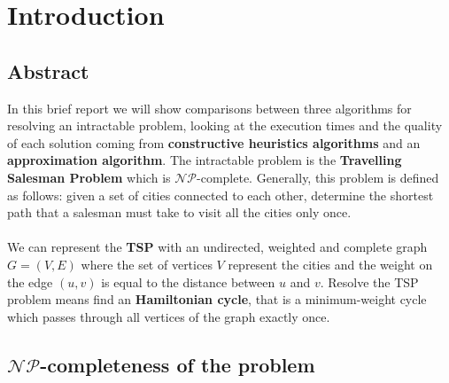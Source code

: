 \section{Introduction}


\subsection{Abstract}
In this brief report we will show comparisons between three algorithms for resolving an intractable problem, looking at the execution times and the quality of each solution coming from \textbf{constructive heuristics algorithms} and an \textbf{approximation algorithm}.
The intractable problem is the \textbf{Travelling Salesman Problem} which is $\mathcal{NP}$-complete. Generally, this problem is defined as follows: given a set of cities connected to each other, determine the shortest path that a salesman must take to visit all the cities only once.\\
\\
\noindent
We can represent the \textbf{TSP} with an undirected, weighted and complete graph $G = (V,E)$ where the set of vertices $V$ represent the cities and the weight on the edge $(u,v)$ is equal to the distance between $u$ and $v$. Resolve the TSP problem means find an \textbf{Hamiltonian cycle}, that is a minimum-weight cycle which passes through all vertices of the graph exactly once.

\subsection{$\mathcal{NP}$-completeness of the problem}

